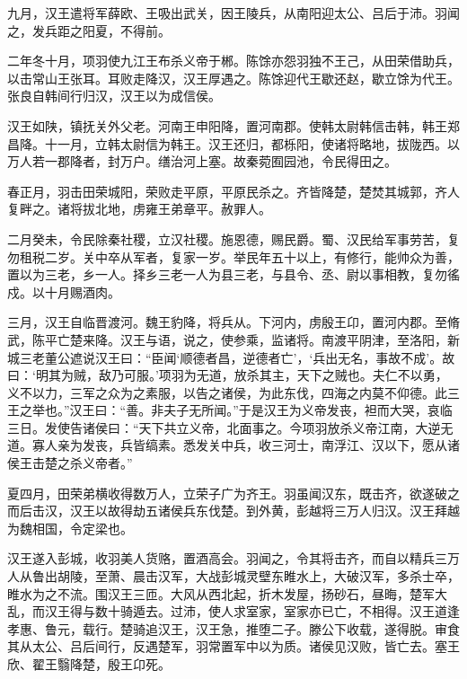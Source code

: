 \documentclass[12pt,UTF8]{ctexbook}
\begin{document}
九月，汉王遣将军薛欧、王吸出武关，因王陵兵，从南阳迎太公、吕后于沛。羽闻之，发兵距之阳夏，不得前。



二年冬十月，项羽使九江王布杀义帝于郴。陈馀亦怨羽独不王己，从田荣借助兵，以击常山王张耳。耳败走降汉，汉王厚遇之。陈馀迎代王歇还赵，歇立馀为代王。张良自韩间行归汉，汉王以为成信侯。



汉王如陕，镇抚关外父老。河南王申阳降，置河南郡。使韩太尉韩信击韩，韩王郑昌降。十一月，立韩太尉信为韩王。汉王还归，都栎阳，使诸将略地，拔陇西。以万人若一郡降者，封万户。缮治河上塞。故秦菀囿园池，令民得田之。



春正月，羽击田荣城阳，荣败走平原，平原民杀之。齐皆降楚，楚焚其城郭，齐人复畔之。诸将拔北地，虏雍王弟章平。赦罪人。



二月癸未，令民除秦社稷，立汉社稷。施恩德，赐民爵。蜀、汉民给军事劳苦，复勿租税二岁。关中卒从军者，复家一岁。举民年五十以上，有修行，能帅众为善，置以为三老，乡一人。择乡三老一人为县三老，与县令、丞、尉以事相教，复勿徭戍。以十月赐酒肉。



三月，汉王自临晋渡河。魏王豹降，将兵从。下河内，虏殷王卬，置河内郡。至脩武，陈平亡楚来降。汉王与语，说之，使参乘，监诸将。南渡平阴津，至洛阳，新城三老董公遮说汉王曰：“臣闻‘顺德者昌，逆德者亡’，‘兵出无名，事故不成’。故曰：‘明其为贼，敌乃可服。’项羽为无道，放杀其主，天下之贼也。夫仁不以勇，义不以力，三军之众为之素服，以告之诸侯，为此东伐，四海之内莫不仰德。此三王之举也。”汉王曰：“善。非夫子无所闻。”于是汉王为义帝发丧，袒而大哭，哀临三日。发使告诸侯曰：“天下共立义帝，北面事之。今项羽放杀义帝江南，大逆无道。寡人亲为发丧，兵皆缟素。悉发关中兵，收三河士，南浮江、汉以下，愿从诸侯王击楚之杀义帝者。”



夏四月，田荣弟横收得数万人，立荣子广为齐王。羽虽闻汉东，既击齐，欲遂破之而后击汉，汉王以故得劫五诸侯兵东伐楚。到外黄，彭越将三万人归汉。汉王拜越为魏相国，令定梁也。



汉王遂入彭城，收羽美人货赂，置酒高会。羽闻之，令其将击齐，而自以精兵三万人从鲁出胡陵，至萧、晨击汉军，大战彭城灵壁东睢水上，大破汉军，多杀士卒，睢水为之不流。围汉王三匝。大风从西北起，折木发屋，扬砂石，昼晦，楚军大乱，而汉王得与数十骑遁去。过沛，使人求室家，室家亦已亡，不相得。汉王道逢孝惠、鲁元，载行。楚骑追汉王，汉王急，推堕二子。滕公下收载，遂得脱。审食其从太公、吕后间行，反遇楚军，羽常置军中以为质。诸侯见汉败，皆亡去。塞王欣、翟王翳降楚，殷王卬死。
\end{document}
